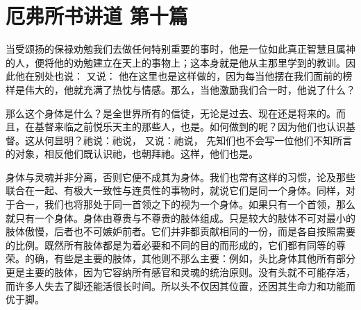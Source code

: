 

\section{厄弗所书讲道 第十篇}

\par

\par

当受颂扬的保禄劝勉我们去做任何特别重要的事时，他是一位如此真正智慧且属神的人，便将他的劝勉建立在天上的事物上；这本身就是他从主那里学到的教训。因此他在别处也说： 又说： 他在这里也是这样做的，因为每当他摆在我们面前的榜样是伟大的，他就充满了热忱与情感。那么，当他激励我们合一时，他说了什么？\par

\par

那么这个身体是什么？是全世界所有的信徒，无论是过去、现在还是将来的。而且，在基督来临之前悦乐天主的那些人，也是。如何做到的呢？因为他们也认识基督。这从何显明？祂说：祂说， 又说：祂说， 先知们也不会写一位他们不知所言的对象，相反他们既认识祂，也朝拜祂。这样，他们也是。\par

身体与灵魂并非分离，否则它便不成其为身体。我们也常有这样的习惯，论及那些联合在一起、有极大一致性与连贯性的事物时，就说它们是同一个身体。同样，对于合一，我们也将那处于同一首领之下的视为一个身体。如果只有一个首领，那么就只有一个身体。身体由尊贵与不尊贵的肢体组成。只是较大的肢体不可对最小的肢体傲慢，后者也不可嫉妒前者。它们并非都贡献相同的一份，而是各自按照需要的比例。既然所有肢体都是为着必要和不同的目的而形成的，它们都有同等的尊荣。的确，有些是主要的肢体，其他则不那么主要：例如，头比身体其他所有部分更是主要的肢体，因为它容纳所有感官和灵魂的统治原则。没有头就不可能存活，而许多人失去了脚还能活很长时间。所以头不仅因其位置，还因其生命力和功能而优于脚。\par

